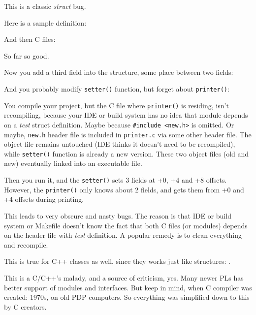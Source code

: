 
This is a classic \emph{struct} bug.

Here is a sample definition:



And then C files:





So far so good.

Now you add a third field into the structure, some place between two fields:



And you probably modify \verb|setter()| function, but forget about \verb|printer()|:



You compile your project, but the C file where \verb|printer()| is residing, isn't recompiling,
because your \ac{IDE} or build system
has no idea that module depends on a \emph{test} struct definition.
Maybe because \verb|#include <new.h>| is omitted.
Or maybe, \verb|new.h| header file is included in \verb|printer.c| via some other header file.
The object file remains untouched (\ac{IDE} thinks it doesn't need to be recompiled),
while \verb|setter()| function is already a new version.
These two object files (old and new) eventually linked into an executable file.

Then you run it, and the \verb|setter()| sets 3 fields at +0, +4 and +8 offsets.
However, the \verb|printer()| only knows about 2 fields, and gets them from +0 and +4 offsets during printing.

This leads to very obscure and nasty bugs.
The reason is that \ac{IDE} or build system or Makefile doesn't know the fact that both C files (or modules) depends on the header
file with \emph{test} definition.
A popular remedy is to clean everything and recompile.

This is true for C++ classes as well, since they works just like structures: .

This is a C/C++'s malady, and a source of criticism, yes.
Many newer \ac{PL}s has better support of modules and interfaces.
But keep in mind, when C compiler was created: 1970s, on old PDP computers.
So everything was simplified down to this by C creators.

